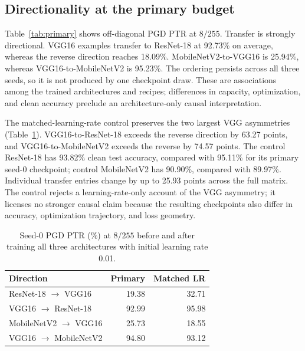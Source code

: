 \documentclass[10pt,twocolumn]{article}
\begin{document}
\subsection{Directionality at the primary budget}
Table~\ref{tab:primary} shows off-diagonal PGD PTR at $8/255$. Transfer is strongly directional. VGG16 examples transfer to ResNet-18 at 92.73\% on average, whereas the reverse direction reaches 18.09\%. MobileNetV2-to-VGG16 is 25.94\%, whereas VGG16-to-MobileNetV2 is 95.23\%. The ordering persists across all three seeds, so it is not produced by one checkpoint draw. These are associations among the trained architectures and recipes; differences in capacity, optimization, and clean accuracy preclude an architecture-only causal interpretation.

\begin{table}[t]
\centering
\caption{PGD PTR (\%) at $8/255$, reported as mean [minimum, maximum] over three training seeds.}
\label{tab:primary}
\end{table}

The matched-learning-rate control preserves the two largest VGG asymmetries (Table~\ref{tab:lrcontrol}). VGG16-to-ResNet-18 exceeds the reverse direction by 63.27 points, and VGG16-to-MobileNetV2 exceeds the reverse by 74.57 points. The control ResNet-18 has 93.82\% clean test accuracy, compared with 95.11\% for its primary seed-0 checkpoint; control MobileNetV2 has 90.90\%, compared with 89.97\%. Individual transfer entries change by up to 25.93 points across the full matrix. The control rejects a learning-rate-only account of the VGG asymmetry; it licenses no stronger causal claim because the resulting checkpoints also differ in accuracy, optimization trajectory, and loss geometry.

\begin{table}[t]
\centering
\caption{Seed-0 PGD PTR (\%) at $8/255$ before and after training all three architectures with initial learning rate 0.01.}
\label{tab:lrcontrol}
\begin{tabular}{lrr}
\toprule
Direction & Primary & Matched LR\\
\midrule
ResNet-18 $\rightarrow$ VGG16 & 19.38 & 32.71\\
VGG16 $\rightarrow$ ResNet-18 & 92.99 & 95.98\\
MobileNetV2 $\rightarrow$ VGG16 & 25.73 & 18.55\\
VGG16 $\rightarrow$ MobileNetV2 & 94.80 & 93.12\\
\bottomrule
\end{tabular}
\end{table}
\end{document}
